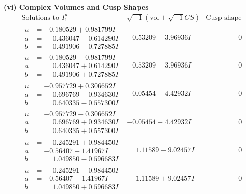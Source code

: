 \documentclass[1p]{elsarticle_modified}
\theoremstyle{definition}
\newcommand{\I}{\sqrt{-1}}
\begin{document}
\newpage\flushleft \textbf{(vi) Complex Volumes and Cusp Shapes}
$$\begin{array}{c|c|c}  
\text{Solutions to }I^u_{1}& \I (\text{vol} + \sqrt{-1}CS) & \text{Cusp shape}\\
 \hline 
\begin{aligned}
u &= -0.180529 + 0.981799 I \\
a &= \phantom{-}0.436047 - 0.614290 I \\
b &= \phantom{-}0.491906 - 0.727885 I\end{aligned}
 & -0.53209 + 3.96936 I & \phantom{-0.000000 } 0 \\ \hline\begin{aligned}
u &= -0.180529 - 0.981799 I \\
a &= \phantom{-}0.436047 + 0.614290 I \\
b &= \phantom{-}0.491906 + 0.727885 I\end{aligned}
 & -0.53209 - 3.96936 I & \phantom{-0.000000 } 0 \\ \hline\begin{aligned}
u &= -0.957729 + 0.306652 I \\
a &= \phantom{-}0.696769 - 0.934630 I \\
b &= \phantom{-}0.640335 - 0.557300 I\end{aligned}
 & -0.05454 - 4.42932 I & \phantom{-0.000000 } 0 \\ \hline\begin{aligned}
u &= -0.957729 - 0.306652 I \\
a &= \phantom{-}0.696769 + 0.934630 I \\
b &= \phantom{-}0.640335 + 0.557300 I\end{aligned}
 & -0.05454 + 4.42932 I & \phantom{-0.000000 } 0 \\ \hline\begin{aligned}
u &= \phantom{-}0.245291 + 0.984450 I \\
a &= -0.56407 - 1.41967 I \\
b &= \phantom{-}1.049850 - 0.596683 I\end{aligned}
 & \phantom{-}1.11589 - 9.02457 I & \phantom{-0.000000 } 0 \\ \hline\begin{aligned}
u &= \phantom{-}0.245291 - 0.984450 I \\
a &= -0.56407 + 1.41967 I \\
b &= \phantom{-}1.049850 + 0.596683 I\end{aligned}
 & \phantom{-}1.11589 + 9.02457 I & \phantom{-0.000000 } 0 \\ \hline\begin{aligned}

\end{aligned}
\end{array}$$
\end{document}
